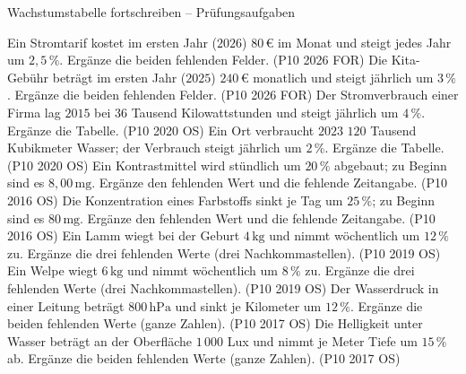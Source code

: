 \begin{aufgabe}{Wachstumstabelle fortschreiben – Prüfungsaufgaben}
\begin{teile}
\teil Ein Stromtarif kostet im ersten Jahr ($2026$) $80\,€$ im Monat und steigt jedes Jahr um $2{,}5\,\%$. Ergänze die beiden fehlenden Felder. \hfill (P10 2026 FOR) 
\teil Die Kita-Gebühr beträgt im ersten Jahr ($2025$) $240\,€$ monatlich und steigt jährlich um $3\,\%$. Ergänze die beiden fehlenden Felder. \hfill (P10 2026 FOR) 
\teil Der Stromverbrauch einer Firma lag $2015$ bei $36$ Tausend Kilowattstunden und steigt jährlich um $4\,\%$. Ergänze die Tabelle. \hfill (P10 2020 OS) 
\teil Ein Ort verbraucht $2023$ $120$ Tausend Kubikmeter Wasser; der Verbrauch steigt jährlich um $2\,\%$. Ergänze die Tabelle. \hfill (P10 2020 OS) 
\teil Ein Kontrastmittel wird stündlich um $20\,\%$ abgebaut; zu Beginn sind es $8{,}00\,\mathrm{mg}$. Ergänze den fehlenden Wert und die fehlende Zeitangabe. \hfill (P10 2016 OS) 
\teil Die Konzentration eines Farbstoffs sinkt je Tag um $25\,\%$; zu Beginn sind es $80\,\mathrm{mg}$. Ergänze den fehlenden Wert und die fehlende Zeitangabe. \hfill (P10 2016 OS) 
\teil Ein Lamm wiegt bei der Geburt $4\,\mathrm{kg}$ und nimmt wöchentlich um $12\,\%$ zu. Ergänze die drei fehlenden Werte (drei Nachkommastellen). \hfill (P10 2019 OS) 
\teil Ein Welpe wiegt $6\,\mathrm{kg}$ und nimmt wöchentlich um $8\,\%$ zu. Ergänze die drei fehlenden Werte (drei Nachkommastellen). \hfill (P10 2019 OS) 
\teil Der Wasserdruck in einer Leitung beträgt $800\,\mathrm{hPa}$ und sinkt je Kilometer um $12\,\%$. Ergänze die beiden fehlenden Werte (ganze Zahlen). \hfill (P10 2017 OS) 
\teil Die Helligkeit unter Wasser beträgt an der Oberfläche $1\,000$ Lux und nimmt je Meter Tiefe um $15\,\%$ ab. Ergänze die beiden fehlenden Werte (ganze Zahlen). \hfill (P10 2017 OS) 
\end{teile}
\end{aufgabe}

